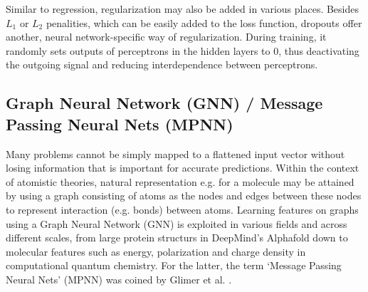 Similar to regression, regularization may also be added in various places. Besides $L_1$ or $L_2$ penalities, which can be easily added to the loss function, dropouts offer another, neural network-specific way of regularization. During training, it randomly sets outputs of perceptrons in the hidden layers to 0, thus deactivating the outgoing signal and reducing interdependence between perceptrons. 

\subsection{Graph Neural Network (GNN) / Message Passing Neural Nets (MPNN)}
\label{subsec:background_gnn}
Many problems cannot be simply mapped to a flattened input vector without losing information that is important for accurate predictions. Within the context of atomistic theories, natural representation e.g. for a molecule may be attained by using a graph consisting of atoms as the nodes and edges between these nodes to represent interaction (e.g. bonds) between atoms. Learning features on graphs using a Graph Neural Network (GNN) is exploited in various fields and across different scales, from large protein structurs in DeepMind's Alphafold \parencite{ref:alphafold} down to molecular features such as energy, polarization and charge density in computational quantum chemistry. For the latter, the term `Message Passing Neural Nets' (MPNN) was coined by Glimer et al. \parencite{ref:gilmer2017neural}.\\

